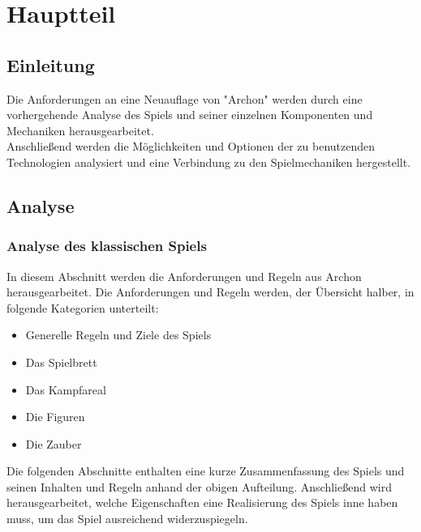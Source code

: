 \chapter{Hauptteil}
\label{cha:Hauptteil}

\section{Einleitung}
Die Anforderungen an eine Neuauflage von "Archon" werden durch eine vorhergehende Analyse des Spiels und seiner einzelnen Komponenten und Mechaniken herausgearbeitet.\\
Anschließend werden die Möglichkeiten und Optionen der zu benutzenden Technologien analysiert und eine Verbindung zu den Spielmechaniken hergestellt.

\section{Analyse}
\label{sec:analyse}

\subsection{Analyse des klassischen Spiels}
\label{subsec:spiel_analyse}
In diesem Abschnitt werden die Anforderungen und Regeln aus Archon herausgearbeitet. Die Anforderungen und Regeln werden, der Übersicht halber, in folgende Kategorien unterteilt: 
\begin{itemize}
	\item Generelle Regeln und Ziele des Spiels
	\item Das Spielbrett
	\item Das Kampfareal
	\item Die Figuren
	\item Die Zauber
\end{itemize}
Die folgenden Abschnitte enthalten eine kurze Zusammenfassung des Spiels und seinen Inhalten und Regeln anhand der obigen Aufteilung. Anschließend wird herausgearbeitet, welche Eigenschaften eine Realisierung des Spiels inne haben muss, um das Spiel ausreichend widerzuspiegeln. 
